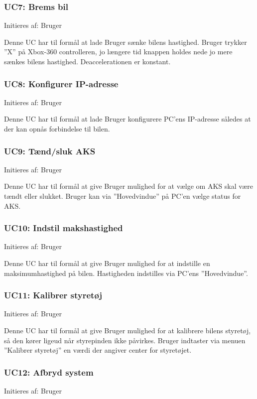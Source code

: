 \subsubsection{UC7: Brems bil}
Initieres af: Bruger

Denne UC har til formål at lade Bruger sænke bilens hastighed. Bruger trykker ''X'' på Xbox-360 controlleren, jo længere tid knappen holdes nede jo mere sænkes bilens hastighed. Deaccelerationen er konstant.

\subsubsection{UC8: Konfigurer IP-adresse}
Initieres af: Bruger

Denne UC har til formål at lade Bruger konfigurere PC'ens IP-adresse således at der kan opnås forbindelse til bilen.  

\subsubsection{UC9: Tænd/sluk AKS}
Initieres af: Bruger

Denne UC har til formål at give Bruger mulighed for at vælge om AKS skal være tændt eller slukket. Bruger kan via ''Hovedvindue'' på PC'en vælge status for AKS. 

\subsubsection{UC10: Indstil makshastighed}
Initieres af: Bruger

Denne UC har til formål at give Bruger mulighed for at indstille en maksimumhastighed på bilen. Hastigheden indstilles via PC'ens ''Hovedvindue''.

\subsubsection{UC11: Kalibrer styretøj}
Initieres af: Bruger

Denne UC har til formål at give Bruger mulighed for at kalibrere bilens styretøj, så den kører ligeud når styrepinden ikke påvirkes. Bruger indtaster via menuen ''Kalibrer styretøj'' en værdi der angiver center for styretøjet.

\subsubsection{UC12: Afbryd system}
Initieres af: Bruger

